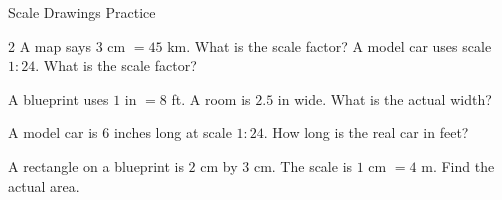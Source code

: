 
\newpage
\begin{stepPractice}{Scale Drawings Practice}
    \resetProblems

    \begin{multicols}{2}
    \prob A map says $3$ cm $= 45$ km. What is the scale factor? \answerBlank[2.5cm]
    \prob A model car uses scale $1{:}24$. What is the scale factor? \answerBlank[2.5cm]
    \end{multicols}

    \prob A blueprint uses $1$ in $= 8$ ft. A room is $2.5$ in wide. What is the actual width? \answerBlank[2.5cm]

    \prob A model car is $6$ inches long at scale $1{:}24$. How long is the real car in feet? \answerBlank[2.5cm]

    \prob A rectangle on a blueprint is $2$ cm by $3$ cm. The scale is $1$ cm $= 4$ m. Find the actual area. \answerBlank[2.5cm]

\end{stepPractice}
